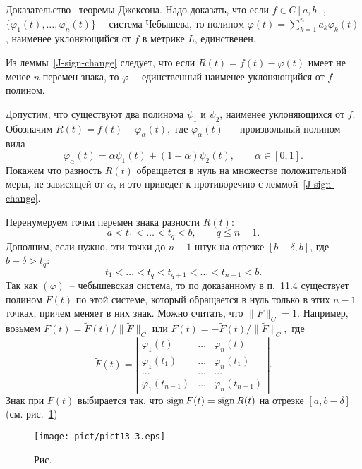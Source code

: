 Д\;о\;к\;а\;з\;а\;т\;е\;л\;ь\;с\;т\;в\;о~ теоремы Джексона. Надо доказать,
что если $f\in C[a,b]$, $\{\varphi_1(t),\ldots,\varphi_n(t)\}$~--
{система Чебышева}, то полином $\varphi(t)=\sum\limits_{k=1}^n a_k
\varphi_k(t)$, наименее уклоняющийся от $f$ в метрике $L$, единственен.

Из леммы~\ref{J-sign-change} следует, что если $R(t)=f(t)-\varphi(t)$
имеет не менее $n$ перемен знака,
то $\varphi$~-- единственный наименее уклоняющийся от $f$ полином.

Допустим, что существуют два полинома $\psi_1$ и $\psi_2$, наименее
уклоняющихся от $f.$
Обозначим $R(t)=f(t)-\varphi_{\alpha}(t),$ где $\varphi_{\alpha}(t)$
~-- произвольный полином вида
$$
{\varphi_\alpha(t)}=\alpha\psi_1(t)+(1-\alpha)\psi_2(t),\qquad \alpha\in [0,1].
$$
{Покажем что} разность $R(t)$ обращается в нуль на множестве
положительной меры, не зависящей от $\alpha$, и это приведет к противоречию с
леммой~\ref{J-sign-change}.

{Перенумеруем} точки перемен знака разности $R(t)$:
$$
a<t_1<\ldots<t_q<b,\qquad q\le n-1.
$$
Дополним, если нужно, эти точки до $n-1$ штук на отрезке $[b-\delta,b]$, где $b-\delta>t_q$:
$$ t_1<\ldots<t_q<t_{q+1}<\ldots<t_{n-1}<b. $$
Так как $(\varphi)$~-- чебышевская система, то по доказанному в п.~11.4
существует полином $F(t)$ по этой системе, который обращается в
нуль только в этих $n-1$ точках, причем меняет в них знак.
Можно считать, что $\|F\|_C=1$. Например, возьмем $F(t)=
\widetilde F(t)/\|\widetilde F\|_C$ или $F(t)=
-\widetilde F(t)/\|\widetilde F\|_C,$ где
$$
\widetilde F(t)=\left|
\begin{array}{ccc}
\varphi_1(t) & \ldots &  \varphi_n(t)\\
\varphi_1(t_1) & \ldots &  \varphi_n(t_1)\\
\ldots & \ldots &  \ldots\\
\varphi_1(t_{n-1}) & \ldots &  \varphi_n(t_{n-1})
\end{array}
\right| .
$$
Знак при $F(t)$ выбирается так, что ${\rm sign \, } F(t)={\rm sign \, } R(t)$
на отрезке $[a,b-\delta]$ (см. рис.~\ref{r13-3})

 \bigskip
\begin{figure}[ht]
\begin{center}
\texttt{[image: pict/pict13-3.eps]}
\end{center}
 \bigskip
 \label{r13-3}

 \centerline{Рис.~\theris}
 \bigskip
\end{figure}



